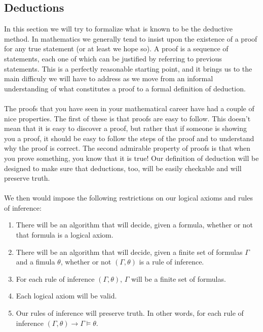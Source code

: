 \documentclass[10pt,a4paper]{article}
\begin{document}
                \subsection{Deductions}
                    In this section we will try to formalize what is known to be the deductive method. In mathematics we generally tend to insist upon the existence of a proof for any true statement (or at least we hope so). A proof is a sequence of statements, each one of which can be justified by referring to previous statements. This is a perfectly reasonable starting point, and it brings us to the main difficuly we will have to address as we move from an informal understanding of what constitutes a proof to a formal definition of deduction.
                    \\
                    \\
                    The proofs that you have seen in your mathematical career have had a couple of nice properties. The first of these is that proofs are easy to follow. This doesn't mean that it is easy to discover a proof, but rather that if someone is showing you a proof, it should be easy to follow the steps of the proof and to understand why the proof is correct. The second admirable property of proofs is that when you prove something, you know that it is true! Our definition of deduction will be designed to make sure that deductions, too, will be easily checkable and will preserve truth.
                    \\
                    \\
                    We then would impose the following restrictions on our logical axioms and rules of inference:
                    \begin{enumerate}
                        \item There will be an algorithm that will decide, given a formula, whether or not that formula is a logical axiom.
                        \item There will be an algorithm that will decide, given a finite set of formulas $\Gamma$ and a fimula $\theta$, whether or not $(\Gamma,\theta)$ is a rule of inference.
                        \item For each rule of inference $(\Gamma,\theta)$, $\Gamma$ will be a finite set of formulas.
                        \item Each logical axiom will be valid.
                        \item Our rules of inference will preserve truth. In other words, for each rule of inference $(\Gamma, \theta)\rightarrow \Gamma\vDash\theta$.
                    \end{enumerate}
\end{document}
